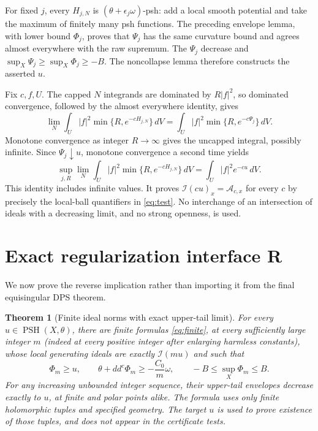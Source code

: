 \documentclass[11pt]{article}
\newcommand{\I}{\mathcal I}
\newcommand{\A}{\mathcal A}
\newcommand{\PSH}{\operatorname{PSH}}
\newtheorem{theorem}{Theorem}[section]
\theoremstyle{definition}
\begin{document}
For fixed $j$, every $H_{j,N}$ is
$(\theta+\epsilon_j\omega)$-psh: add a local smooth potential and
take the maximum of finitely many psh functions. The preceding
envelope lemma, with lower bound $\Phi_j$, proves that $\Psi_j$
has the same curvature bound and agrees almost everywhere with the
raw supremum. The $\Psi_j$ decrease and
$\sup_X\Psi_j\geq\sup_X\Phi_j\geq-B$. The noncollapse lemma
therefore constructs the asserted $u$.

Fix $c,f,U$. The capped $N$ integrands are dominated by
$R|f|^2$, so dominated convergence, followed by the almost
everywhere identity, gives
\begin{equation}\label{eq:Nlimit}
 \lim_N\int_U|f|^2\min\{R,e^{-cH_{j,N}}\}\,dV
 =\int_U|f|^2\min\{R,e^{-c\Psi_j}\}\,dV.
\end{equation}
Monotone convergence as integer $R\to\infty$ gives the uncapped
integral, possibly infinite. Since $\Psi_j\downarrow u$,
monotone convergence a second time yields
\begin{equation}\label{eq:integralidentity}
 \sup_{j,R}\lim_N\int_U|f|^2\min\{R,e^{-cH_{j,N}}\}\,dV
 =\int_U|f|^2e^{-cu}\,dV.
\end{equation}
This identity includes infinite values. It proves
$\I(cu)_x=\A_{c,x}$ for every $c$ by precisely the local-ball
quantifiers in \eqref{eq:test}. No interchange of an intersection
of ideals with a decreasing limit, and no strong openness, is used.

\section{Exact regularization interface R}\label{sec:R}
We now prove the reverse implication rather than importing it from
the final equisingular DPS theorem.
\begin{theorem}[Finite ideal norms with exact upper-tail limit]\label{thm:R}
For every $u\in\PSH(X,\theta)$, there are finite formulas
\eqref{eq:finite}, at every sufficiently large integer $m$ (indeed
at every positive integer after enlarging harmless constants),
whose local generating ideals are exactly $\I(mu)$ and such that
\[
 \Phi_m\geq u,\qquad
 \theta+dd^c\Phi_m\geq-\frac{C_0}{m}\omega,
 \qquad -B\leq\sup_X\Phi_m\leq B.
\]
For any increasing unbounded integer sequence, their upper-tail
envelopes decrease exactly to $u$, at finite and polar points alike.
The formula uses only finite holomorphic tuples and specified
geometry. The target $u$ is used to prove existence of those tuples,
and does not appear in the certificate tests.
\end{theorem}
\end{document}
